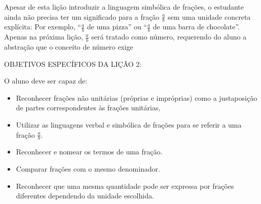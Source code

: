\documentclass[oneside]{book}
\begin{document}
Apesar de esta lição introduzir a linguagem simbólica de frações, o estudante ainda não precisa ter um significado para a fração $\frac{a}{b}$ sem uma unidade concreta explícita: Por exemplo, ``$\frac{a}{b}$ de uma pizza'' ou ``$\frac{a}{b}$ de uma barra de chocolate''. Apenas na próxima lição, $\frac{a}{b}$ será tratado como número, requerendo do aluno a abstração que o conceito de número exige
\vspace{.1cm}

\noindent OBJETIVOS ESPECÍFICOS DA LIÇÃO 2:
\vspace{.1cm}

\noindent O aluno deve ser capaz de:
\begin{itemize}
 \item Reconhecer frações não unitárias (próprias e impróprias) como a justaposição de partes correspondentes às frações unitárias,  
  \item  Utilizar as linguagens verbal e simbólica de frações para se referir a uma fração $\frac{a}{b}$.
  \item  Reconhecer e nomear os termos de uma fração.
  \item  Comparar frações com o mesmo denominador.
  \item  Reconhecer que uma mesma quantidade pode ser expressa por frações diferentes dependendo da unidade escolhida.
\end{itemize}
\end{document}

